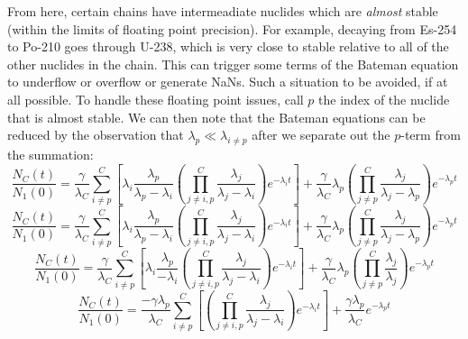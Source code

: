 \documentclass[letterpaper]{physor2018}
\begin{document}
From here, certain chains have intermeadiate nuclides which are \emph{almost} stable
(within the limits of floating point precision). For example, decaying
from Es-254 to Po-210 goes through U-238, which is very close to stable relative to all of the
other nuclides in the chain. This can trigger some terms of the Bateman equation to
underflow or overflow or generate NaNs. Such a situation to be avoided,
if at all possible. To handle these floating point issues, call $p$ the index of the nuclide
that is almost stable. We can then note that the Bateman equations can be reduced by the
observation that $\lambda_p \ll \lambda_{i\ne p}$ after we separate out the $p$-term
from the summation:
\begin{equation}
\label{almost-stable-0}
\frac{N_C(t)}{N_1(0)} = \frac{\gamma}{\lambda_C}\sum_{i\ne p}^C \left[\lambda_i \frac{\lambda_p}{\lambda_p - \lambda_i}
                                                    \left(\prod_{j\ne i,p}^C \frac{\lambda_j}{\lambda_j - \lambda_i}\right)
                                                    e^{-\lambda_i t}\right]
                       + \frac{\gamma}{\lambda_C} \lambda_p \left(\prod_{j\ne p}^C \frac{\lambda_j}{\lambda_j - \lambda_p} \right) e^{-\lambda_p t}
\end{equation}
\begin{equation}
\label{almost-stable-1}
\frac{N_C(t)}{N_1(0)} = \frac{\gamma}{\lambda_C}\sum_{i\ne p}^C \left[\lambda_i \frac{\lambda_p}{\lambda_p - \lambda_i}
                                                    \left(\prod_{j\ne i,p}^C \frac{\lambda_j}{\lambda_j - \lambda_i}\right)
                                                    e^{-\lambda_i t}\right]
                       + \frac{\gamma}{\lambda_C} \lambda_p \left(\prod_{j\ne p}^C \frac{\lambda_j}{\lambda_j - \lambda_p}\right) e^{-\lambda_p t}
\end{equation}
\begin{equation}
\label{almost-stable-2}
   \frac{N_C(t)}{N_1(0)} = \frac{\gamma}{\lambda_C}\sum_{i\ne p}^C \left[\lambda_i \frac{\lambda_p}{- \lambda_i}
                                                        \left(\prod_{j\ne i,p}^C \frac{\lambda_j}{\lambda_j - \lambda_i}\right)
                                                        e^{-\lambda_i t}\right]
                           + \frac{\gamma}{\lambda_C} \lambda_p \left(\prod_{j\ne p}^C \frac{\lambda_j}{\lambda_j}\right) e^{-\lambda_p t}
\end{equation}
\begin{equation}
\label{almost-stable-3}
   \frac{N_C(t)}{N_1(0)} = \frac{-\gamma\lambda_p}{\lambda_C}\sum_{i\ne p}^C \left[
                                                        \left(\prod_{j\ne i,p}^C \frac{\lambda_j}{\lambda_j - \lambda_i}\right)
                                                        e^{-\lambda_i t}\right]
                           + \frac{\gamma\lambda_p}{\lambda_C} e^{-\lambda_p t}
\end{equation}
\end{document}
